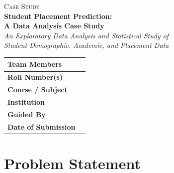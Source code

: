 \documentclass[11pt]{article}
\begin{document}
\begin{titlepage}
\centering
\vspace*{2.5cm}

{\large\textsc{Case Study}}\\[1cm]

{\huge\bfseries\color{headingblue} Student Placement Prediction:}\\[0.3cm]
{\huge\bfseries\color{headingblue} A Data Analysis Case Study}\\[1.2cm]

{\itshape\large\color{gray} An Exploratory Data Analysis and Statistical Study of\\
Student Demographic, Academic, and Placement Data}\\[2.5cm]

\begin{tabularx}{0.75\linewidth}{|>{\bfseries}p{4cm}|X|}
\hline
Team Members & \rule{0pt}{1em}\underline{\hspace{6cm}} \\ \hline
Roll Number(s) & \underline{\hspace{6cm}} \\ \hline
Course / Subject & \underline{\hspace{6cm}} \\ \hline
Institution & \underline{\hspace{6cm}} \\ \hline
Guided By & \underline{\hspace{6cm}} \\ \hline
Date of Submission & \underline{\hspace{6cm}} \\ \hline
\end{tabularx}

\vfill
\end{titlepage}

\tableofcontents
\newpage

\section{Problem Statement}
\end{document}
